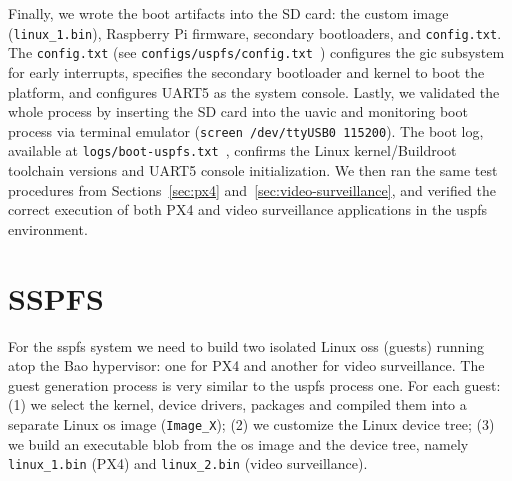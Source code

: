 Finally, we wrote the boot artifacts into the SD card: the custom image
(\lstinline{linux_1.bin}), Raspberry Pi firmware, secondary bootloaders, and
\lstinline{config.txt}. The \lstinline{config.txt} (see
\lstinline{configs/uspfs/config.txt}~\cite{thesis-sw-github}) configures the
\gls{gic} subsystem for early interrupts, specifies the secondary bootloader and
kernel to boot the platform, and configures UART5 as the system console.
%
Lastly, we validated the whole process by inserting the SD card into the
\gls{uavic} and monitoring boot process via terminal emulator (\lstinline{screen /dev/ttyUSB0 115200}).
The boot log, available at
\lstinline{logs/boot-uspfs.txt}~\cite{thesis-sw-github}, confirms the Linux
kernel/Buildroot toolchain versions and UART5 console initialization.
We then ran the same test procedures from Sections~\ref{sec:px4}
and~\ref{sec:video-surveillance}, and verified the correct execution of both PX4 and video surveillance applications in the \gls{uspfs} environment.

\section{SSPFS}
\label{sec:sspfs-implem}
For the \gls{sspfs} system we need to build two isolated Linux \glspl{os}
(guests) running atop the Bao hypervisor: one for PX4 and another for video
surveillance.
The guest generation process is very similar to the \gls{uspfs} process one. For
each guest:
(1) we select the kernel, device drivers, packages and compiled them into a
separate Linux \gls{os} image (\lstinline{Image_X});
(2) we customize the Linux device tree;
(3) we build an executable blob from the \gls{os} image and the device tree,
namely \lstinline{linux_1.bin} (PX4) and \lstinline{linux_2.bin} (video
surveillance).

